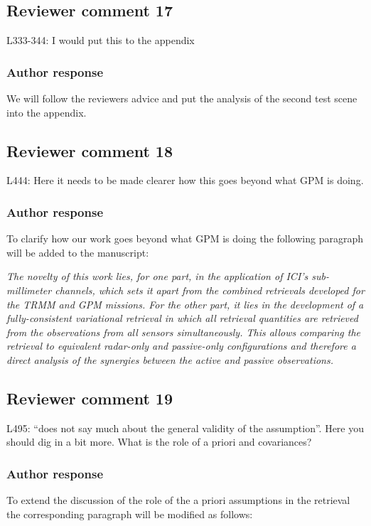 \documentclass[11pt]{scrartcl}
\begin{document}
\subsection*{Reviewer comment 17}
L333-344: I would put this to the appendix

\subsubsection*{Author response}
We will follow the reviewers advice and put the analysis of the second test scene
into the appendix.

\subsection*{Reviewer comment 18}
L444: Here it needs to be made clearer how this goes beyond what GPM is doing.


\subsubsection*{Author response}

To clarify how our work goes beyond what GPM is doing the following paragraph
will be added to the manuscript:

{\itshape The novelty of this work lies, for one part, in the application of ICI's
sub-millimeter channels, which sets it apart from the combined retrievals
developed for the TRMM and GPM missions. For the other part, it lies in the
development of a fully-consistent variational retrieval in which all retrieval
quantities are retrieved from the observations from all sensors simultaneously.
This allows comparing the retrieval to equivalent radar-only and passive-only
configurations and therefore a direct analysis of the synergies between the
active and passive observations.}

\subsection*{Reviewer comment 19}
L495:  “does not say much about the general validity of the assumption”.   Here you should dig in a bit more. What is the role of a priori and covariances?

\subsubsection*{Author response}

To extend the discussion of the role of the a priori assumptions in the retrieval
the corresponding paragraph will be modified as follows:
\end{document}
